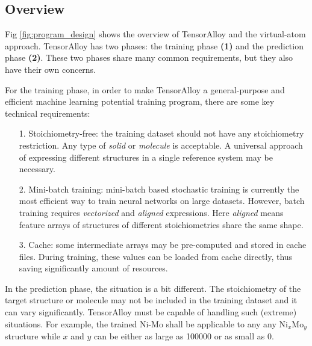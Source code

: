 \documentclass[preprint]{revtex4-2}
\begin{document}
% 
%
\subsection{Overview}
\label{section:overview}

Fig \ref{fig:program_design} shows the overview of TensorAlloy and the 
virtual-atom approach.
TensorAlloy has two phases: the training phase \textbf{(1)} and the prediction 
phase \textbf{(2)}. These two phases share many common requirements, but they 
also have their own concerns.

For the training phase, in order to make TensorAlloy a general-purpose and
efficient machine learning potential training program, there are some key 
technical requirements:
\begin{itemize}
    
    \item[1.] 
    Stoichiometry-free: the training dataset should not have any stoichiometry 
    restriction. Any type of \textit{solid} or \textit{molecule} is acceptable. 
    A universal approach of expressing different structures in a single 
    reference system may be necessary.
    
    \item[2.] 
    Mini-batch training: mini-batch based stochastic training is 
    currently the most efficient way to train neural networks on large datasets.
    However, batch training requires \textit{vectorized} and \textit{aligned} 
    expressions. Here \textit{aligned} means feature arrays of structures of 
    different stoichiometries share the same shape. 
    
    \item[3.] 
    Cache: some intermediate arrays may be pre-computed and stored in cache 
    files. During training, these values can be loaded from cache directly, thus 
    saving significantly amount of resources.

\end{itemize}

In the prediction phase, the situation is a bit different. The stoichiometry of 
the target structure or molecule may not be included in the training dataset and 
it can vary significantly. TensorAlloy must be capable of handling such 
(extreme) situations. For example, the trained Ni-Mo shall be applicable to any 
any $\mathrm{Ni}_{x}\mathrm{Mo}_{y}$ structure while $x$ and $y$ can be 
either as large as 100000 or as small as 0. 
\end{document}
